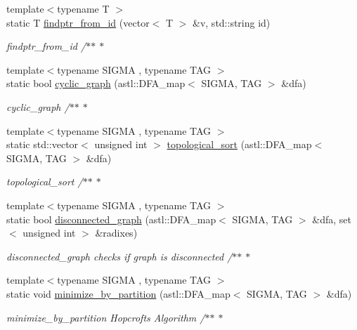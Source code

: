 \begin{DoxyCompactItemize}
{\footnotesize template$<$typename T $>$ }\\static T \hyperlink{class_utils_a9c17eb284b87af0bb9d71cdc08be3b0c}{findptr\+\_\+from\+\_\+id} (vector$<$ T $>$ \&v, std\+::string id)
\begin{DoxyCompactList}\small\item\em findptr\+\_\+from\+\_\+id /$\ast$$\ast$ $\ast$ \end{DoxyCompactList}\item 
{\footnotesize template$<$typename S\+I\+G\+MA , typename T\+AG $>$ }\\static bool \hyperlink{class_utils_af4e7092e603d58d89b11fd2619e0fbf5}{cyclic\+\_\+graph} (astl\+::\+D\+F\+A\+\_\+map$<$ S\+I\+G\+MA, T\+AG $>$ \&dfa)
\begin{DoxyCompactList}\small\item\em cyclic\+\_\+graph /$\ast$$\ast$ $\ast$ \end{DoxyCompactList}\item 
{\footnotesize template$<$typename S\+I\+G\+MA , typename T\+AG $>$ }\\static std\+::vector$<$ unsigned int $>$ \hyperlink{class_utils_ad942df63e0acc46e4bc3a45894bee37a}{topological\+\_\+sort} (astl\+::\+D\+F\+A\+\_\+map$<$ S\+I\+G\+MA, T\+AG $>$ \&dfa)
\begin{DoxyCompactList}\small\item\em topological\+\_\+sort /$\ast$$\ast$ $\ast$ \end{DoxyCompactList}\item 
{\footnotesize template$<$typename S\+I\+G\+MA , typename T\+AG $>$ }\\static bool \hyperlink{class_utils_af47d96c02cc09059732afa2a2345d68a}{disconnected\+\_\+graph} (astl\+::\+D\+F\+A\+\_\+map$<$ S\+I\+G\+MA, T\+AG $>$ \&dfa, set$<$ unsigned int $>$ \&radixes)
\begin{DoxyCompactList}\small\item\em disconnected\+\_\+graph checks if graph is disconnected /$\ast$$\ast$ $\ast$ \end{DoxyCompactList}\item 
{\footnotesize template$<$typename S\+I\+G\+MA , typename T\+AG $>$ }\\static void \hyperlink{class_utils_aa1110027883961c446dc33814ee3e937}{minimize\+\_\+by\+\_\+partition} (astl\+::\+D\+F\+A\+\_\+map$<$ S\+I\+G\+MA, T\+AG $>$ \&dfa)
\begin{DoxyCompactList}\small\item\em minimize\+\_\+by\+\_\+partition Hopcroft\textquotesingle{}s Algorithm /$\ast$$\ast$ $\ast$ \end{DoxyCompactList}\item 

\end{DoxyCompactItemize}
